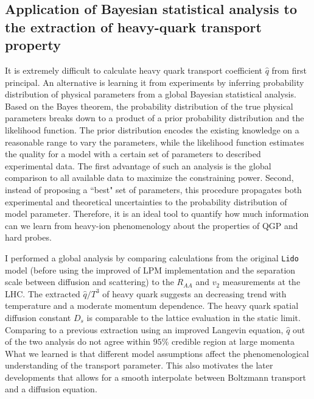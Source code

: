 \documentclass[12pt,a4paper]{article}
\begin{document}
\subsection{Application of Bayesian statistical analysis to the extraction of heavy-quark transport property}
It is extremely difficult to calculate heavy quark transport coefficient $\hat{q}$ from first principal. 
An alternative is learning it from experiments by inferring probability distribution of physical parameters from a global Bayesian statistical analysis.
Based on the Bayes theorem, the probability distribution of the true physical parameters breaks down to a product of a prior probability distribution and the likelihood function.
The prior distribution encodes the existing knowledge on a reasonable range to vary the parameters, while the likelihood function estimates the quality for a model with a certain set of parameters to described experimental data.
The first advantage of such an analysis is the global comparison to all available data to maximize the constraining power.
Second, instead of proposing a ``best" set of parameters, this procedure propagates both experimental and theoretical uncertainties to the probability distribution of model parameter.
Therefore, it is an ideal tool to quantify how much information can we learn from heavy-ion phenomenology about the properties of QGP and hard probes.

I performed a global analysis by comparing calculations from the original {\tt Lido} model (before using the improved of LPM implementation and the separation scale between diffusion and scattering) to the $R_{AA}$ and $v_{2}$ measurements at the LHC. 
The extracted $\hat{q}/T^3$ of heavy quark suggests an decreasing trend with temperature and a moderate momentum dependence.
The heavy quark spatial diffusion constant $D_s$ is comparable to the lattice evaluation in the static limit.
Comparing to a previous extraction using an improved Langevin equation, $\hat{q}$ out of the two analysis do not agree within $95\%$ credible region at large momenta
What we learned is that different model assumptions affect the phenomenological understanding of the transport parameter.
This also motivates the later developments that allows for a smooth interpolate between Boltzmann transport and a diffusion equation.
\end{document}
